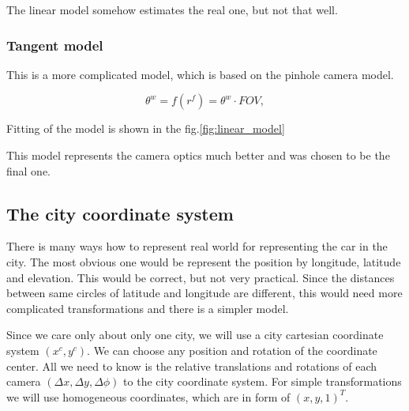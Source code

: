 \documentclass[a4paper,12pt,titlepage, twoside]{article}
\numberwithin{figure}{section}
\begin{document}

The linear model somehow estimates the real one, but not that well.

\subsubsection{Tangent model}

This is a more complicated model, which is based on the pinhole camera model.

\begin{equation}
\theta^w = f(r^f) = \theta^w \cdot FOV,
\end{equation}

Fitting of the model is shown in the fig.\ref{fig:linear_model}


This model represents the camera optics much better and was chosen to be the final one.

\subsection{The city coordinate system}

There is many ways how to represent real world for representing the car in the city. The most obvious one would be represent the position by longitude, latitude and elevation. This would be correct, but not very practical. Since the distances between same circles of latitude and longitude are different, this would need more complicated transformations and there is a simpler model. 

Since we care only about only one city, we will use a city cartesian coordinate system $(x^c, y^c)$. We can choose any position and rotation of the coordinate center. All we need to know is the relative translations and rotations of each camera $(\Delta x, \Delta y, \Delta\phi)$ to the city coordinate system. For simple transformations we will use homogeneous coordinates, which are in form of $(x, y, 1)^T$. 
\end{document}
